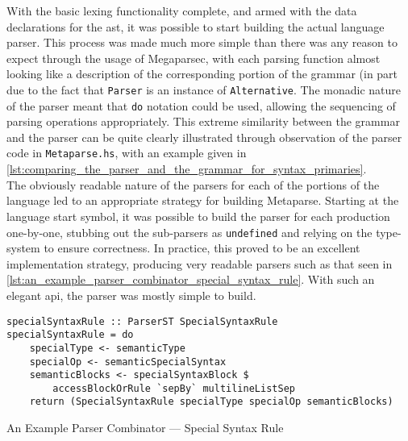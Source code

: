 With the basic lexing functionality complete, and armed with the data declarations for the \gls{ast}, it was possible to start building the actual language parser. 
This process was made much more simple than there was any reason to expect through the usage of Megaparsec, with each parsing function almost looking like a description of the corresponding portion of the grammar (in part due to the fact that \texttt{Parser} is an instance of \texttt{Alternative}. 
The monadic nature of the parser meant that \texttt{do} notation could be used, allowing the sequencing of parsing operations appropriately. 
This extreme similarity between the grammar and the parser can be quite clearly illustrated through observation of the parser code in \texttt{Metaparse.hs}, with an example given in \autoref{lst:comparing_the_parser_and_the_grammar_for_syntax_primaries}.\\

The obviously readable nature of the parsers for each of the portions of the language led to an appropriate strategy for building Metaparse.
Starting at the language start symbol, it was possible to build the parser for each production one-by-one, stubbing out the sub-parsers as \texttt{undefined} and relying on the type-system to ensure correctness.
In practice, this proved to be an excellent implementation strategy, producing very readable parsers such as that seen in \autoref{lst:an_example_parser_combinator_special_syntax_rule}.
With such an elegant \gls{api}, the parser was mostly simple to build. 

\begin{listing}[!htb]
\begin{verbatim}
specialSyntaxRule :: ParserST SpecialSyntaxRule
specialSyntaxRule = do
    specialType <- semanticType
    specialOp <- semanticSpecialSyntax
    semanticBlocks <- specialSyntaxBlock $
        accessBlockOrRule `sepBy` multilineListSep
    return (SpecialSyntaxRule specialType specialOp semanticBlocks)
\end{verbatim}
\caption{An Example Parser Combinator --- Special Syntax Rule}
\label{lst:an_example_parser_combinator_special_syntax_rule}
\end{listing}

